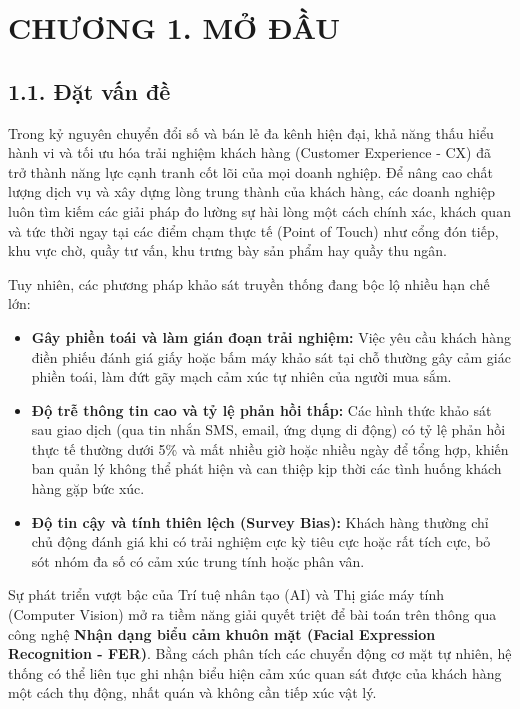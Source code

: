 \section*{CHƯƠNG 1. MỞ ĐẦU}
\setcounter{section}{1}
\setcounter{subsection}{0}
\setcounter{figure}{0}
\setcounter{table}{0}

\subsection*{1.1. Đặt vấn đề}

Trong kỷ nguyên chuyển đổi số và bán lẻ đa kênh hiện đại, khả năng thấu hiểu hành vi và tối ưu hóa trải nghiệm khách hàng (Customer Experience - CX) đã trở thành năng lực cạnh tranh cốt lõi của mọi doanh nghiệp. Để nâng cao chất lượng dịch vụ và xây dựng lòng trung thành của khách hàng, các doanh nghiệp luôn tìm kiếm các giải pháp đo lường sự hài lòng một cách chính xác, khách quan và tức thời ngay tại các điểm chạm thực tế (Point of Touch) như cổng đón tiếp, khu vực chờ, quầy tư vấn, khu trưng bày sản phẩm hay quầy thu ngân.

Tuy nhiên, các phương pháp khảo sát truyền thống đang bộc lộ nhiều hạn chế lớn:
\begin{itemize}
    \item \textbf{Gây phiền toái và làm gián đoạn trải nghiệm:} Việc yêu cầu khách hàng điền phiếu đánh giá giấy hoặc bấm máy khảo sát tại chỗ thường gây cảm giác phiền toái, làm đứt gãy mạch cảm xúc tự nhiên của người mua sắm.
    \item \textbf{Độ trễ thông tin cao và tỷ lệ phản hồi thấp:} Các hình thức khảo sát sau giao dịch (qua tin nhắn SMS, email, ứng dụng di động) có tỷ lệ phản hồi thực tế thường dưới 5\% và mất nhiều giờ hoặc nhiều ngày để tổng hợp, khiến ban quản lý không thể phát hiện và can thiệp kịp thời các tình huống khách hàng gặp bức xúc.
    \item \textbf{Độ tin cậy và tính thiên lệch (Survey Bias):} Khách hàng thường chỉ chủ động đánh giá khi có trải nghiệm cực kỳ tiêu cực hoặc rất tích cực, bỏ sót nhóm đa số có cảm xúc trung tính hoặc phân vân.
\end{itemize}

Sự phát triển vượt bậc của Trí tuệ nhân tạo (AI) và Thị giác máy tính (Computer Vision) mở ra tiềm năng giải quyết triệt để bài toán trên thông qua công nghệ \textbf{Nhận dạng biểu cảm khuôn mặt (Facial Expression Recognition - FER)}. Bằng cách phân tích các chuyển động cơ mặt tự nhiên, hệ thống có thể liên tục ghi nhận biểu hiện cảm xúc quan sát được của khách hàng một cách thụ động, nhất quán và không cần tiếp xúc vật lý.

